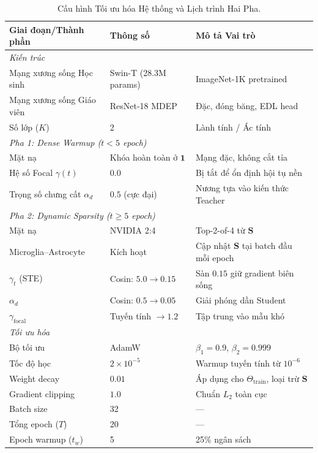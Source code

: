 \documentclass[11pt, a4paper]{article}
\begin{document}
\begin{table}[H]
\centering
\caption{Cấu hình Tối ưu hóa Hệ thống và Lịch trình Hai Pha.}
\label{tab:config}
\begin{tabular}{@{}lll@{}}
\toprule
\textbf{Giai đoạn/Thành phần} & \textbf{Thông số} & \textbf{Mô tả Vai trò} \\
\midrule
\multicolumn{3}{l}{\emph{Kiến trúc}} \\
Mạng xương sống Học sinh & Swin-T (28.3M params) & ImageNet-1K pretrained \\
Mạng xương sống Giáo viên & ResNet-18 MDEP & Đặc, đóng băng, EDL head \\
Số lớp ($K$) & 2 & Lành tính / Ác tính \\
\midrule
\multicolumn{3}{l}{\emph{Pha 1: Dense Warmup ($t < 5$ epoch)}} \\
Mặt nạ & Khóa hoàn toàn ở $\bm{1}$ & Mạng đặc, không cắt tỉa \\
Hệ số Focal $\gamma(t)$ & $0.0$ & Bị tắt để ổn định hội tụ nền \\
Trọng số chưng cất $\alpha_d$ & $0.5$ (cực đại) & Nương tựa vào kiến thức Teacher \\
\midrule
\multicolumn{3}{l}{\emph{Pha 2: Dynamic Sparsity ($t \ge 5$ epoch)}} \\
Mặt nạ & NVIDIA 2:4 & Top-2-of-4 từ $\bm{S}$ \\
Microglia--Astrocyte & Kích hoạt & Cập nhật $\bm{S}$ tại batch đầu mỗi epoch \\
$\gamma_t$ (STE) & Cosin: $5.0 \to 0.15$ & Sàn $0.15$ giữ gradient biên sống \\
$\alpha_d$ & Cosin: $0.5 \to 0.05$ & Giải phóng dần Student \\
$\gamma_{\text{focal}}$ & Tuyến tính $\to 1.2$ & Tập trung vào mẫu khó \\
\midrule
\multicolumn{3}{l}{\emph{Tối ưu hóa}} \\
Bộ tối ưu & AdamW~\cite{loshchilov2019decoupled, kingma2015adam} & $\beta_1=0.9$, $\beta_2=0.999$ \\
Tốc độ học & $2 \times 10^{-5}$ & Warmup tuyến tính từ $10^{-6}$ \\
Weight decay & $0.01$ & Áp dụng cho $\Theta_{\text{train}}$, loại trừ $\bm{S}$ \\
Gradient clipping & $1.0$ & Chuẩn $L_2$ toàn cục \\
Batch size & 32 & --- \\
Tổng epoch ($T$) & 20 & --- \\
Epoch warmup ($t_w$) & 5 & 25\% ngân sách \\

\end{tabular}
\end{table}
\end{document}
